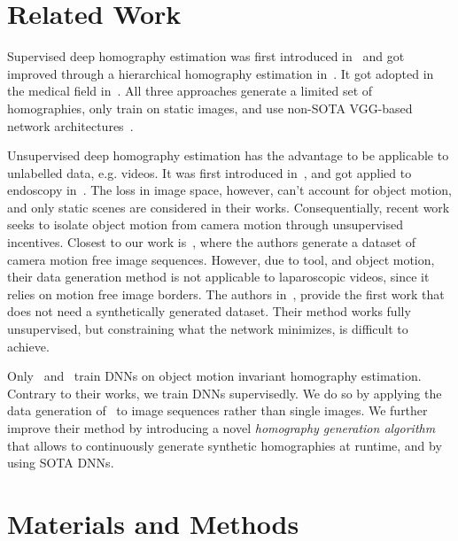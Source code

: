 \section{Related Work}

Supervised deep homography estimation was first introduced in~\cite{detone2016deep} and got improved through a hierarchical homography estimation in~\cite{erlik2017homography}. It got adopted in the medical field in~\cite{bano2020deep}. All three approaches generate a limited set of homographies, only train on static images, and use non-SOTA VGG-based network architectures~\cite{simonyan2014very}.

Unsupervised deep homography estimation has the advantage to be applicable to unlabelled data, e.g. videos. It was first introduced in~\cite{nguyen2018unsupervised}, and got applied to endoscopy in~\cite{gomes2019unsupervised}. The loss in image space, however, can't account for object motion, and only static scenes are considered in their works. Consequentially, recent work seeks to isolate object motion from camera motion through unsupervised incentives. Closest to our work is~\cite{le2020deep}, where the authors generate a dataset of camera motion free image sequences. However, due to tool, and object motion, their data generation method is not applicable to laparoscopic videos, since it relies on motion free image borders. The authors in~\cite{zhang2020content}, provide the first work that does not need a synthetically generated dataset. Their method works fully unsupervised, but constraining what the network minimizes, is difficult to achieve.

Only~\cite{le2020deep} and~\cite{zhang2020content} train DNNs on object motion invariant homography estimation. Contrary to their works, we train DNNs supervisedly. We do so by applying the data generation of~\cite{detone2016deep} to image sequences rather than single images. We further improve their method by introducing a novel \textit{homography generation algorithm} that allows to continuously generate synthetic homographies at runtime, and by using SOTA DNNs.

\section{Materials and Methods}

